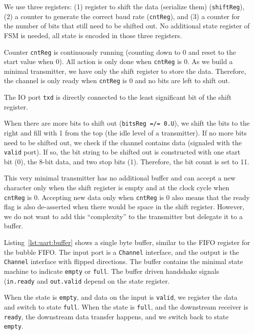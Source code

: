 \documentclass[%
    10pt,
    headinclude, footexclude,
    openright, %
    notitlepage,
    cleardoubleempty,
    headsepline,
    pointlessnumbers,
    bibtotoc, idxtotoc,
    ]{scrbook}
\newcommand{\code}[1]{{\small{\texttt{#1}}}}
\begin{document}
We use three registers:
(1) register to shift the data (serialize them) (\code{shiftReg}),
(2) a counter to generate the correct baud rate (\code{cntReg}), and
(3) a counter for the number of bits that still need to be shifted out.
No additional state register of FSM is needed, all state is encoded in
those three registers.

Counter \code{cntReg} is continuously running (counting down to 0
and reset to the start value when 0). All action is only done when
\code{cntReg} is 0. As we build a minimal transmitter, we have only
the shift register to store the data. Therefore, the channel is only ready
when \code{cntReg} is 0 and no bits are left to shift out.

The IO port \code{txd} is directly connected to the least significant bit
of the shift register.

When there are more bits to shift out (\code{bitsReg =/= 0.U}),
we shift the bits to the right and fill with 1 from the top (the idle level
of a transmitter).
If no more bits need to be shifted out, we check if the channel contains
data (signaled with the \code{valid} port). If so, the bit string to
be shifted out is constructed with one start bit (0), the 8-bit data, and
two stop bits (1). Therefore, the bit count is set to 11.

This very minimal transmitter has no additional buffer and can
accept a new character only when the shift register is empty
and at the clock cycle when \code{cntReg} is 0.
Accepting new data only when \code{cntReg} is 0 also means
that the ready flag is also de-asserted when there would be
space in the shift register. However, we do not want to add this
``complexity'' to the transmitter but delegate it to a buffer.

Listing~\ref{lst:uart:buffer} shows a single byte buffer, similar to
the FIFO register for the bubble FIFO. The input port is a \code{Channel}
interface, and the output is the \code{Channel} interface with
flipped directions. The buffer contains the minimal state machine
to indicate \code{empty} or \code{full}. The buffer driven handshake
signals (\code{in.ready} and \code{out.valid} depend on the state
register.

When the state is \code{empty}, and data on the input is \code{valid},
we register the data and switch to state \code{full}.
When the state is \code{full}, and the downstream receiver is
\code{ready}, the downstream data transfer happens, and we switch
back to state \code{empty}.
\end{document}
